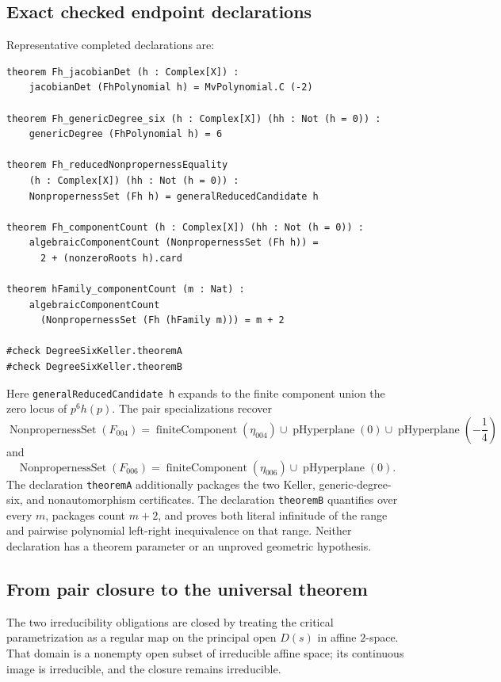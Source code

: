 \documentclass[11pt]{article}
\begin{document}
\subsection{Exact checked endpoint declarations}

Representative completed declarations are:
\begin{lstlisting}[language={}]
theorem Fh_jacobianDet (h : Complex[X]) :
    jacobianDet (FhPolynomial h) = MvPolynomial.C (-2)

theorem Fh_genericDegree_six (h : Complex[X]) (hh : Not (h = 0)) :
    genericDegree (FhPolynomial h) = 6

theorem Fh_reducedNonpropernessEquality
    (h : Complex[X]) (hh : Not (h = 0)) :
    NonpropernessSet (Fh h) = generalReducedCandidate h

theorem Fh_componentCount (h : Complex[X]) (hh : Not (h = 0)) :
    algebraicComponentCount (NonpropernessSet (Fh h)) =
      2 + (nonzeroRoots h).card

theorem hFamily_componentCount (m : Nat) :
    algebraicComponentCount
      (NonpropernessSet (Fh (hFamily m))) = m + 2

#check DegreeSixKeller.theoremA
#check DegreeSixKeller.theoremB
\end{lstlisting}
Here \texttt{generalReducedCandidate h} expands to the finite component union
the zero locus of $p^6h(p)$.  The pair specializations recover
\[
 \operatorname{NonpropernessSet}(F_{004})
 =\operatorname{finiteComponent}(\eta_{004})
   \cup\operatorname{pHyperplane}(0)
   \cup\operatorname{pHyperplane}\!\left(-\frac14\right)
\]
and
\[
 \operatorname{NonpropernessSet}(F_{006})
 =\operatorname{finiteComponent}(\eta_{006})
   \cup\operatorname{pHyperplane}(0).
\]
The declaration \texttt{theoremA} additionally packages the two Keller,
generic-degree-six, and nonautomorphism certificates.  The declaration
\texttt{theoremB} quantifies over every $m$, packages count $m+2$, and proves
both literal infinitude of the range and pairwise polynomial left-right
inequivalence on that range.  Neither declaration has a theorem parameter or
an unproved geometric hypothesis.

\subsection{From pair closure to the universal theorem}

The two irreducibility obligations are closed by treating the critical
parametrization as a regular map on the principal open $D(s)$ in affine
$2$-space.  That domain is a nonempty open subset of irreducible affine space;
its continuous image is irreducible, and the closure remains irreducible.
\end{document}
